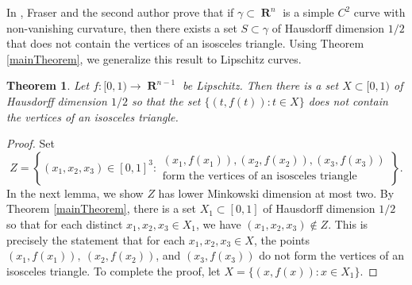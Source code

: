 \documentclass[dvipsnames,letterpaper,12pt]{article}
\numberwithin{equation}{section}
\theoremstyle{plain}
\newtheorem{theorem}{Theorem}
\theoremstyle{remark}
\DeclareMathOperator{\RR}{\mathbf{R}}
\begin{document}
In \cite{MalabikaRob}, Fraser and the second author prove that if $\gamma\subset\RR^n$ is a simple $C^2$ curve with non-vanishing curvature, then there exists a set $S\subset\gamma$ of Hausdorff dimension $1/2$ that does not contain the vertices of an isosceles triangle. Using Theorem \ref{mainTheorem}, we generalize this result to Lipschitz curves. 

\begin{theorem}\label{C1IsoscelesThm}
	Let $f\colon [0,1) \to \RR^{n-1}$ be Lipschitz. Then there is a set $X \subset [0,1)$ of Hausdorff dimension $1/2$ so that the set $\{(t,f(t)) : t\in X\}$ does not contain the vertices of an isosceles triangle.
\end{theorem}
\begin{proof}
	Set
	\[ Z = \left\{ (x_1,x_2,x_3) \in [0,1]^3: \begin{array}{c} (x_1,f(x_1)), (x_2,f(x_2)), (x_3,f(x_3))\\
		\textrm{form the vertices of an isosceles triangle} \end{array} \right\}. \]
	In the next lemma, we show $Z$ has lower Minkowski dimension at most two. By Theorem \ref{mainTheorem}, there is a set $X_1\subset[0,1]$ of Hausdorff dimension $1/2$ so that for each distinct $x_1,x_2,x_3\in X_1$, we have $(x_1,x_2,x_3)\not\in Z$. This is precisely the statement that for each $x_1,x_2,x_3\in X$, the points $(x_1,f(x_1)),\ (x_2,f(x_2))$, and $(x_3,f(x_3))$ do not form the vertices of an isosceles triangle. To complete the proof, let $X = \{ (x,f(x)) : x \in X_1 \}$.
\end{proof}
\end{document}
